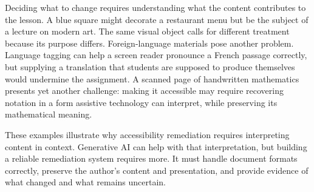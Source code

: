 
Deciding what to change requires understanding what the content contributes to the lesson. A blue square might decorate a restaurant menu but be the subject of a lecture on modern art. The same visual object calls for different treatment because its purpose differs. Foreign-language materials pose another problem. Language tagging can help a screen reader pronounce a French passage correctly, but supplying a translation that students are supposed to produce themselves would undermine the assignment. A scanned page of handwritten mathematics presents yet another challenge: making it accessible may require recovering notation in a form assistive technology can interpret, while preserving its mathematical meaning.


These examples illustrate why accessibility remediation requires interpreting content in context. Generative AI can help with that interpretation, but building a reliable remediation system requires more. It must handle document formats correctly, preserve the author’s content and presentation, and provide evidence of what changed and what remains uncertain.
